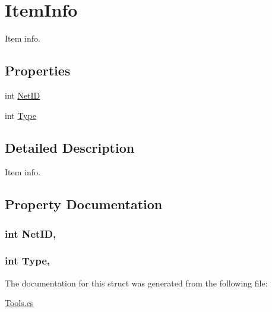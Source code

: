 \hypertarget{structOTA_1_1ItemInfo}{}\section{Item\+Info}
\label{structOTA_1_1ItemInfo}


Item info.  


\subsection*{Properties}
\begin{DoxyCompactItemize}
\item 
int \hyperlink{structOTA_1_1ItemInfo_a695a967c8b6970a86a81a4b21b2b2666}{Net\+I\+D}
\item 
int \hyperlink{structOTA_1_1ItemInfo_ae011432eaca3858364b05a111f4011d3}{Type}
\end{DoxyCompactItemize}


\subsection{Detailed Description}
Item info. 



\subsection{Property Documentation}
\hypertarget{structOTA_1_1ItemInfo_a695a967c8b6970a86a81a4b21b2b2666}{}
\subsubsection[{Net\+I\+D}]{\setlength{\rightskip}{0pt plus 5cm}int Net\+I\+D\hspace{0.3cm}{\ttfamily [get]}, {\ttfamily [set]}}\label{structOTA_1_1ItemInfo_a695a967c8b6970a86a81a4b21b2b2666}
\hypertarget{structOTA_1_1ItemInfo_ae011432eaca3858364b05a111f4011d3}{}
\subsubsection[{Type}]{\setlength{\rightskip}{0pt plus 5cm}int Type\hspace{0.3cm}{\ttfamily [get]}, {\ttfamily [set]}}\label{structOTA_1_1ItemInfo_ae011432eaca3858364b05a111f4011d3}


The documentation for this struct was generated from the following file\+:\begin{DoxyCompactItemize}
\item 
\hyperlink{Tools_8cs}{Tools.\+cs}\end{DoxyCompactItemize}
